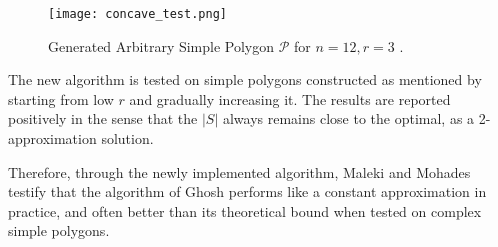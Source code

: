 \begin{figure}[h!]
    \centering
    \texttt{[image: concave\_test.png]}
    \caption{Generated Arbitrary Simple Polygon $\mathcal P$ for $n = 12, r = 3$ \cite{maleki2022implementation}.}
    \label{fig:arbitrary}
\end{figure}

The new algorithm is tested on simple polygons constructed as mentioned by starting from low $r$ and gradually increasing it. The results are reported positively in the sense that the $|S|$ always remains close to the optimal, as a 2-approximation solution.

Therefore, through the newly implemented algorithm, Maleki and Mohades \cite{maleki2022implementation} testify that the algorithm of Ghosh \cite{GHOSH2010718} performs like a constant approximation in practice, and often better than its theoretical bound when tested on complex simple polygons.
